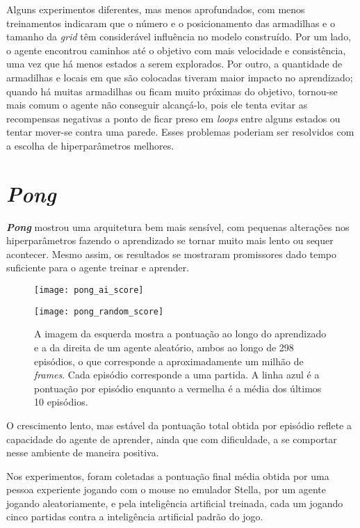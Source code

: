 Alguns experimentos diferentes, mas menos aprofundados, com menos treinamentos indicaram que o número e o posicionamento das armadilhas e o tamanho da \textit{grid} têm considerável influência no modelo construído.
Por um lado, o agente encontrou caminhos até o objetivo com mais velocidade e consistência, uma vez que há menos estados a serem explorados.
Por outro, a quantidade de armadilhas e locais em que são colocadas tiveram maior impacto no aprendizado; quando há muitas armadilhas ou ficam muito próximas do objetivo, tornou-se mais comum o agente não conseguir alcançá-lo, pois ele tenta evitar as recompensas negativas a ponto de ficar preso em \textit{loops} entre alguns estados ou tentar mover-se contra uma parede.
Esses problemas poderiam ser resolvidos com a escolha de hiperparâmetros melhores.

\section{\textit{Pong}}
\label{sec:res_pong}

\textbf{\textit{Pong}} mostrou uma arquitetura bem mais sensível, com pequenas alterações nos hiperparâmetros fazendo o aprendizado se tornar muito mais lento ou sequer acontecer.
Mesmo assim, os resultados se mostraram promissores dado tempo suficiente para o agente treinar e aprender.

\begin{figure}[h!]
  \begin{minipage}[b]{.5\textwidth}
  \centering
  \texttt{[image: pong\_ai\_score]}
  \end{minipage}
  \hfill
  \begin{minipage}[b]{.5\textwidth}
  \centering
  \texttt{[image: pong\_random\_score]}
  \end{minipage}
  \caption{A imagem da esquerda mostra a pontuação ao longo do aprendizado e a da direita de um agente aleatório, ambos ao longo de 298 episódios, o que corresponde a aproximadamente um milhão de \textit{frames}. Cada episódio corresponde a uma partida. A linha azul é a pontuação por episódio enquanto a vermelha é a média dos últimos 10 episódios.}
  \label{fig:pong_score}
\end{figure}

O crescimento lento, mas estável da pontuação total obtida por episódio reflete a capacidade do agente de aprender, ainda que com dificuldade, a se comportar nesse ambiente de maneira positiva.

Nos experimentos, foram coletadas a pontuação final média obtida por uma pessoa experiente jogando com o mouse no emulador Stella, por um agente jogando aleatoriamente, e pela inteligência artificial treinada, cada um jogando cinco partidas contra a inteligência artificial padrão do jogo.

